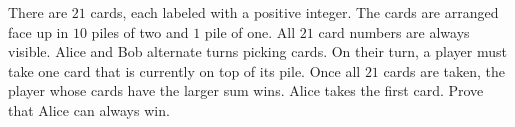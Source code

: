 There are $21$ cards, each labeled with a positive integer. The cards are arranged face up in $10$ piles of two and $1$ pile of one. All $21$ card numbers are always visible. Alice and Bob alternate turns picking cards. On their turn, a player must take one card that is currently on top of its pile. Once all $21$ cards are taken, the player whose cards have the larger sum wins. Alice takes the first card. Prove that Alice can always win.
